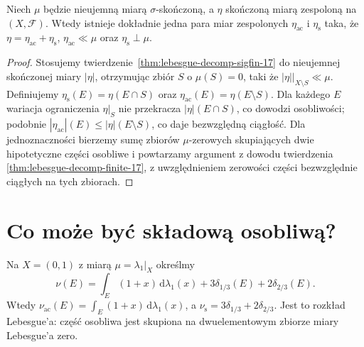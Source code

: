 \begin{wniosek}
\label{cor:complex-lebesgue-decomp-17}
Niech $\mu$ będzie nieujemną miarą $\sigma$-skończoną,
a $\eta$ skończoną miarą zespoloną na $(X,\mathcal F)$.
Wtedy istnieje dokładnie jedna para miar zespolonych
$\eta_{\mathrm{ac}}$ i $\eta_{\mathrm{s}}$ taka, że
$\eta=\eta_{\mathrm{ac}}+\eta_{\mathrm{s}}$,
$\eta_{\mathrm{ac}}\ll\mu$ oraz $\eta_{\mathrm{s}}\perp\mu$.
\end{wniosek}
\begin{proof}
Stosujemy twierdzenie~\ref{thm:lebesgue-decomp-sigfin-17}
do nieujemnej skończonej miary $|\eta|$, otrzymując
zbiór $S$ o $\mu(S)=0$, taki że
$|\eta||_{X\setminus S}\ll\mu$.
Definiujemy $\eta_{\mathrm{s}}(E)=\eta(E\cap S)$
oraz $\eta_{\mathrm{ac}}(E)=\eta(E\setminus S)$.
Dla każdego $E$ wariacja ograniczenia $\eta|_S$
nie przekracza $|\eta|(E\cap S)$, co dowodzi osobliwości;
podobnie $|\eta_{\mathrm{ac}}|(E)\le|\eta|(E\setminus S)$,
co daje bezwzględną ciągłość.
Dla jednoznaczności bierzemy sumę zbiorów
$\mu$-zerowych skupiających dwie hipotetyczne części
osobliwe i powtarzamy argument z dowodu twierdzenia
\ref{thm:lebesgue-decomp-finite-17}, z uwzględnieniem
zerowości części bezwzględnie ciągłych na tych zbiorach.
\end{proof}

\section{Co może być składową osobliwą?}
\begin{przyklad}
Na $X=(0,1)$ z miarą $\mu=\lambda_1|_X$ określmy
\[
\nu(E)=\int_E(1+x)\,\mathrm d\lambda_1(x)
       +3\delta_{1/3}(E)+2\delta_{2/3}(E).
\]
Wtedy $\nu_{\mathrm{ac}}(E)=\int_E(1+x)\,\mathrm d\lambda_1(x)$,
a $\nu_{\mathrm{s}}=3\delta_{1/3}+2\delta_{2/3}$.
Jest to rozkład Lebesgue'a: część osobliwa jest skupiona
na dwuelementowym zbiorze miary Lebesgue'a zero.
\end{przyklad}

